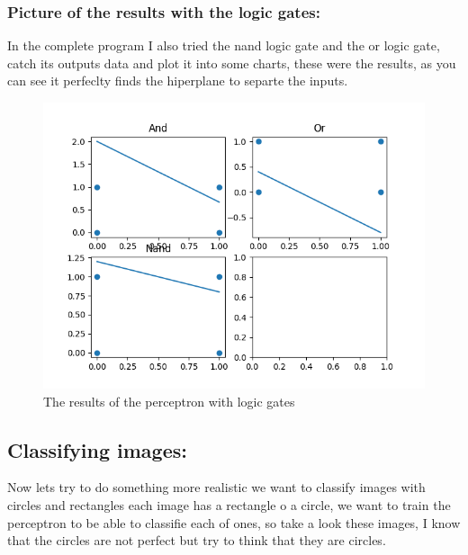 \documentclass[12pt]{article}
\begin{document}
\newpage
\subsubsection{Picture of the results with the logic gates:}
In the complete program I also tried the nand logic gate and the or logic gate, catch its outputs
data and plot it into some charts, these were the results, as you can see  it perfeclty finds the
hiperplane to separte the inputs.
\begin{figure}[H]
  \centering
  \includegraphics[scale = 1]{logic_gates.png}
  \caption{The results of the perceptron with logic gates}
\end{figure}

\newpage
\subsection{Classifying images:}
Now lets try to do something more realistic we want to classify images with circles and rectangles
each image has a rectangle o a circle, we want to train the perceptron to be able to classifie each
of ones, so take a look these images, I know that the circles are not perfect but try to think that
they are circles.
\end{document}
